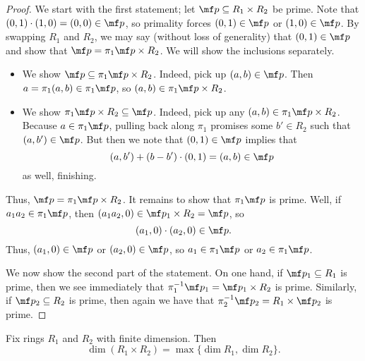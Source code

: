 \begin{proof}
	We start with the first statement; let $\mf p\subseteq R_1\times R_2$ be prime. Note that $(0,1)\cdot(1,0)=(0,0)\in\mf p$, so primality forces $(0,1)\in\mf p$ or $(1,0)\in\mf p$. By swapping $R_1$ and $R_2$, we may say (without loss of generality) that $(0,1)\in\mf p$ and show that $\mf p=\pi_1\mf p\times R_2$. We will show the inclusions separately.
	\begin{itemize}
		\item We show $\mf p\subseteq\pi_1\mf p\times R_2$. Indeed, pick up $(a,b)\in\mf p$. Then $a=\pi_1(a,b)\in\pi_1\mf p$, so $(a,b)\in\pi_1\mf p\times R_2$.
		\item We show $\pi_1\mf p\times R_2\subseteq\mf p$. Indeed, pick up any $(a,b)\in\pi_1\mf p\times R_2$. Because $a\in\pi_1\mf p$, pulling back along $\pi_1$ promises some $b'\in R_2$ such that $(a,b')\in\mf p$. But then we note that $(0,1)\in\mf p$ implies that
		\[(a,b')+(b-b')\cdot(0,1)=(a,b)\in\mf p\]
		as well, finishing.
	\end{itemize}
	Thus, $\mf p=\pi_1\mf p\times R_2$. It remains to show that $\pi_1\mf p$ is prime. Well, if $a_1a_2\in\pi_1\mf p$, then $(a_1a_2,0)\in\mf p_1\times R_2=\mf p$, so
	\[(a_1,0)\cdot(a_2,0)\in\mf p.\]
	Thus, $(a_1,0)\in\mf p$ or $(a_2,0)\in\mf p$, so $a_1\in\pi_1\mf p$ or $a_2\in\pi_1\mf p$.

	We now show the second part of the statement. On one hand, if $\mf p_1\subseteq R_1$ is prime, then we see immediately that $\pi_1^{-1}\mf p_1=\mf p_1\times R_2$ is prime. Similarly, if $\mf p_2\subseteq R_2$ is prime, then again we have that $\pi_2^{-1}\mf p_2=R_1\times\mf p_2$ is prime.
\end{proof}
\begin{corollary} \label{cor:dimofprods}
	Fix rings $R_1$ and $R_2$ with finite dimension. Then
	\[\dim(R_1\times R_2)=\max\{\dim R_1,\dim R_2\}.\]
\end{corollary}
